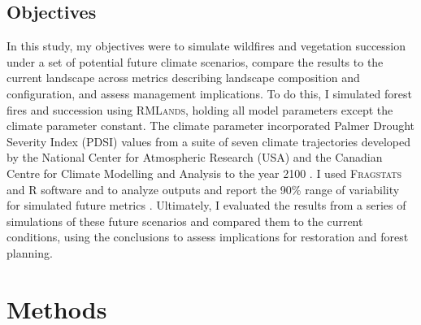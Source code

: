 \subsection*{Objectives}
In this study, my objectives were to simulate wildfires and vegetation succession under a set of potential future climate scenarios, compare the results to the current landscape across metrics describing landscape composition and configuration, and assess management implications. To do this, I simulated forest fires and succession using \textsc{RMLands}, holding all model parameters except the climate parameter constant. The climate parameter incorporated Palmer Drought Severity Index (PDSI) values from a suite of seven climate trajectories developed by the National Center for Atmospheric Research (USA) and the Canadian Centre for Climate Modelling and Analysis to the year 2100 \citep{Cook2014}. I used \textsc{Fragstats} and R software and to analyze outputs and report the 90\% range of variability for simulated future metrics \citep{Fragstats2012,RCoreTeam2013}. Ultimately, I evaluated the results from a series of simulations of these future scenarios and compared them to the current conditions, using the conclusions to assess implications for restoration and forest planning.










\section{Methods}

